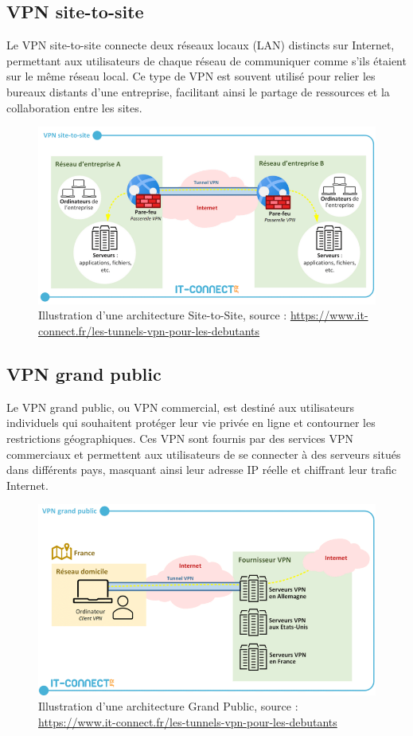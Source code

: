 \documentclass{report}
\begin{document}
\subsection{VPN site-to-site}
Le VPN site-to-site connecte deux réseaux locaux (LAN) distincts sur Internet, permettant aux utilisateurs de chaque réseau de communiquer comme s'ils étaient sur le même réseau local. Ce type de VPN est souvent utilisé pour relier les bureaux distants d'une entreprise, facilitant ainsi le partage de ressources et la collaboration entre les sites.

\begin{figure}[H]
  \centering
  \includegraphics[width=1\textwidth]{img/siteToSite.png}
  \caption{Illustration d'une architecture Site-to-Site, source : \url{https://www.it-connect.fr/les-tunnels-vpn-pour-les-debutants}}
\end{figure}

\subsection{VPN grand public}
Le VPN grand public, ou VPN commercial, est destiné aux utilisateurs individuels qui souhaitent protéger leur vie privée en ligne et contourner les restrictions géographiques. Ces VPN sont fournis par des services VPN commerciaux et permettent aux utilisateurs de se connecter à des serveurs situés dans différents pays, masquant ainsi leur adresse IP réelle et chiffrant leur trafic Internet.

\begin{figure}[H]
  \centering
  \includegraphics[width=1\textwidth]{img/grandPublic.png}
  \caption{Illustration d'une architecture Grand Public, source : \url{https://www.it-connect.fr/les-tunnels-vpn-pour-les-debutants}}
\end{figure}
\end{document}
